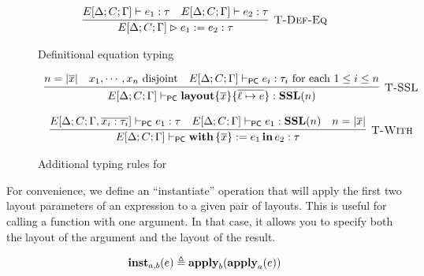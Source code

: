 \begin{figure}
  \[
    \begin{array}{c}
      \labinfer[T-Def-Eq]{E[\Delta;C;\Gamma] \rhd e_1 \defeq e_2 : \tau}
        {E[\Delta;C;\Gamma] \vdash e_1 : \tau
        &E[\Delta;C;\Gamma] \vdash e_2 : \tau}
    \end{array}
  \]
  \caption{Definitional equation typing}
  \label{fig:def-eq}
\end{figure}

\begin{figure}
  \[
    \begin{array}{c}
      \labinfer[T-SSL]{E[\Delta;C;\Gamma] \vdashpc \sslmath{\overline{x}}{\overline{\ell \mapsto e}} : \SSL(n)}
        {n = |\overline{x}|
        &x_1,\cdots,x_n \textnormal{ disjoint}
        &E[\Delta;C;\Gamma] \vdashpc e_i : \tau_i \ensuremath{\textnormal{ for each $1 \le i \le n$}}
        }
      \\\\
      \labinfer[T-With]{E[\Delta;C;\Gamma] \vdashpc \withIn{\{ \overline{x} \} := e_1} e_2 : \tau}
        {E[\Delta;C;\Gamma,\overline{x_i : \tau_i}] \vdashpc e_1 : \tau
        &E[\Delta;C;\Gamma] \vdashpc e_1 : \SSL(n)
        &n = |\overline{x}|
        }
    \end{array}
  \]
  \caption{Additional typing rules for \PikaCore}
  \label{fig:pikacore-typing-judgment}
\end{figure}

For convenience, we define an ``instantiate'' operation \instExpr{} that will apply the first two
layout parameters of an expression to a given pair of layouts. This is useful for calling a function
with one argument. In that case, it allows you to specify both the layout of the argument and the
layout of the result.

\[
  \textbf{inst}_{a,b}(e) \triangleq \textbf{apply}_b(\textbf{apply}_a(e))
\]


